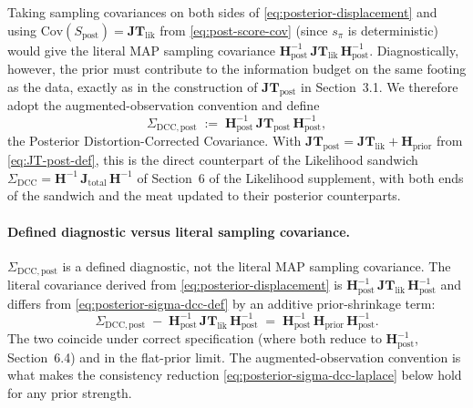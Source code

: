 \documentclass[11pt]{article}
\begin{document}
Taking sampling covariances on both sides of \eqref{eq:posterior-displacement} and using $\mathrm{Cov}(S_{\mathrm{post}}) = \mathbf{JT}_{\mathrm{lik}}$ from \eqref{eq:post-score-cov} (since $s_\pi$ is deterministic) would give the literal MAP sampling covariance $\mathbf H_{\mathrm{post}}^{-1}\, \mathbf{JT}_{\mathrm{lik}}\, \mathbf H_{\mathrm{post}}^{-1}$. Diagnostically, however, the prior must contribute to the information budget on the same footing as the data, exactly as in the construction of $\mathbf{JT}_{\mathrm{post}}$ in Section~3.1. We therefore adopt the augmented-observation convention and define
\begin{equation}
\Sigma_{\mathrm{DCC},\mathrm{post}}
\;:=\;
\mathbf H_{\mathrm{post}}^{-1}\,
\mathbf{JT}_{\mathrm{post}}\,
\mathbf H_{\mathrm{post}}^{-1},
\label{eq:posterior-sigma-dcc-def}
\end{equation}
the Posterior Distortion-Corrected Covariance. With $\mathbf{JT}_{\mathrm{post}} = \mathbf{JT}_{\mathrm{lik}} + \mathbf H_{\mathrm{prior}}$ from \eqref{eq:JT-post-def}, this is the direct counterpart of the Likelihood sandwich $\Sigma_{\mathrm{DCC}} = \mathbf H^{-1}\, \mathbf J_{\mathrm{total}}\, \mathbf H^{-1}$ of Section~6 of the Likelihood supplement, with both ends of the sandwich and the meat updated to their posterior counterparts.

\paragraph{Defined diagnostic versus literal sampling covariance.}
$\Sigma_{\mathrm{DCC},\mathrm{post}}$ is a defined diagnostic, not the literal MAP sampling covariance. The literal covariance derived from \eqref{eq:posterior-displacement} is $\mathbf H_{\mathrm{post}}^{-1}\, \mathbf{JT}_{\mathrm{lik}}\, \mathbf H_{\mathrm{post}}^{-1}$ and differs from \eqref{eq:posterior-sigma-dcc-def} by an additive prior-shrinkage term:
\begin{equation}
\Sigma_{\mathrm{DCC},\mathrm{post}}
\;-\;
\mathbf H_{\mathrm{post}}^{-1}\, \mathbf{JT}_{\mathrm{lik}}\, \mathbf H_{\mathrm{post}}^{-1}
\;=\;
\mathbf H_{\mathrm{post}}^{-1}\, \mathbf H_{\mathrm{prior}}\, \mathbf H_{\mathrm{post}}^{-1}.
\label{eq:posterior-sigma-dcc-gap}
\end{equation}
The two coincide under correct specification (where both reduce to $\mathbf H_{\mathrm{post}}^{-1}$, Section~6.4) and in the flat-prior limit. The augmented-observation convention is what makes the consistency reduction \eqref{eq:posterior-sigma-dcc-laplace} below hold for any prior strength.
\end{document}
